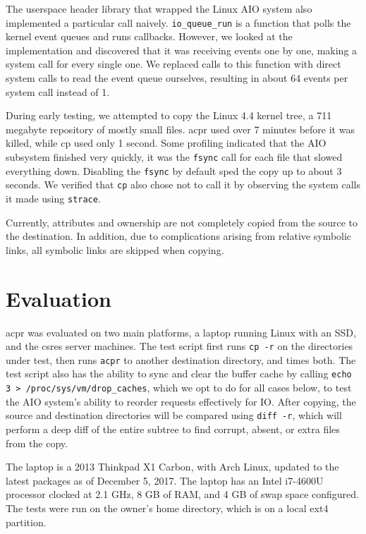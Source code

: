 \documentclass[11pt]{article}
\begin{document}
The userspace header library that wrapped the Linux AIO system also implemented
a particular call naively. \texttt{io\_queue\_run} is a function that polls the
kernel event queues and runs callbacks. However, we looked at the implementation
and discovered that it was receiving events one by one, making a system call for
every single one. We replaced calls to this function with direct system calls to
read the event queue ourselves, resulting in about 64 events per system call
instead of 1.

During early testing, we attempted to copy the Linux 4.4 kernel tree, a 711 megabyte repository of mostly small files. acpr used over 7 minutes before it was killed, while cp used only 1 second. Some profiling indicated that the AIO subsystem finished very quickly, it was the \texttt{fsync} call for each file that slowed everything down. Disabling the \texttt{fsync} by default sped the copy up to about 3 seconds. We verified that \texttt{cp} also chose not to call it by observing the system calls it made using \texttt{strace}.

Currently, attributes and ownership are not completely copied from the source to the destination. In addition, due to complications arising from relative symbolic links, all symbolic links are skipped when copying.

\section{Evaluation}
acpr was evaluated on two main platforms, a laptop running Linux with an SSD, and the csres server machines. The test script first runs \texttt{cp -r} on the directories under test, then runs \texttt{acpr} to another destination directory, and times both. The test script also has the ability to sync and clear the buffer cache by calling \texttt{echo 3 > /proc/sys/vm/drop\_caches}, which we opt to do for all cases below, to test the AIO system's ability to reorder requests effectively for IO. After copying, the source and destination directories will be compared using \texttt{diff -r}, which will perform a deep diff of the entire subtree to find corrupt, absent, or extra files from the copy.

The laptop is a 2013 Thinkpad X1 Carbon, with Arch Linux, updated to the latest packages as of December 5, 2017. The laptop has an Intel i7-4600U processor clocked at 2.1 GHz, 8 GB of RAM, and 4 GB of swap space configured. The tests were run on the owner's home directory, which is on a local ext4 partition.
\end{document}
